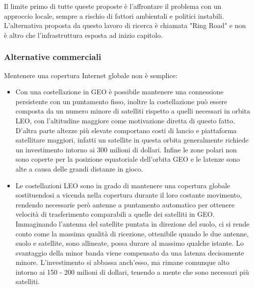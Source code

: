 \documentclass[a4paper]{article}
\begin{document}
			Il limite primo di tutte queste proposte è l'affrontare il problema con un approccio locale, sempre a rischio di fattori ambientali e politici instabili. L'alternativa proposta da questo lavoro di ricerca è chiamata "Ring Road" \cite{burleigh2011toward} e non è altro che l'infrastruttura esposta ad inizio capitolo.
		
		\subsubsection{Alternative commerciali}
		Mentenere una copertura Internet globale non è semplice:
		\begin{itemize}
			\item Con una costellazione in GEO è possibile mantenere una connessione persistente con un puntamento fisso, inoltre la costellazione può essere composta da un numero minore di satelliti rispetto a quelli necessari in orbita LEO, con l'altitudine maggiore come motivazione diretta di questo fatto.
			D'altra parte altezze più elevate comportano costi di lancio e piattaforma satellitare maggiori, infatti un satellite in questa orbita generalmente richiede un investimento intorno ai 300 milioni di dollari. Infine le zone polari non sono coperte per la posizione equatoriale dell'orbita GEO e le latenze sono alte a causa delle grandi distanze in gioco.
			
			\item Le costellazioni LEO sono in grado di mantenere una copertura globale sostituendosi a vicenda nella copertura durante il loro costante movimento, rendendo necessarie però antenne a puntamento automatico per ottenere velocità di trasferimento comparabili a quelle dei satelliti in GEO. Immaginando l'antenna del satellite puntata in direzione del suolo, ci si rende conto come la massima qualità di ricezione, ottenibile quando le due antenne, suolo e satellite, sono allineate, possa durare al massimo qualche istante. Lo svantaggio della minor banda viene compensato da una latenza decisamente minore. L'investimento si abbassa anch'esso, ma rimane comunque alto intorno ai 150 - 200 milioni di dollari, tenendo a mente che sono necessari più satelliti.
		\end{itemize}
		
\end{document}
